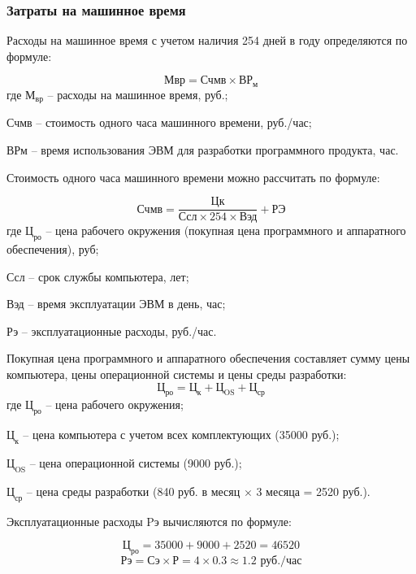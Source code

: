 \documentclass[a4paper]{extarticle}
\begin{document}
\subsubsection{Затраты на машинное время}
Расходы на машинное время с учетом наличия 254 дней в году определяются по формуле:\par
\begin{equation}
\label{form6}
	\text{Мвр}=\text{Счмв}\times \text{ВР}_\text{м}
\end{equation}
где $\text{М}_\text{вр}$ – расходы на машинное время, руб.;\par
Счмв – стоимость одного часа машинного времени, руб./час;\par
ВРм – время использования ЭВМ для разработки программного продукта, час.\par
Стоимость одного часа машинного времени можно рассчитать по формуле:\par
\begin{equation}
\label{form7}
	\text{Счмв}=\frac{\text{Цк}}{\text{Ссл}\times 254\times \text{Вэд}}+\text{РЭ}
\end{equation}
где $\text{Ц}_\text{ро}$ – цена рабочего окружения (покупная цена программного и аппаратного обеспечения), руб;\par
Ссл – срок службы компьютера, лет;\par
Вэд – время эксплуатации ЭВМ в день, час;\par
Рэ – эксплуатационные расходы, руб./час.\par
Покупная цена программного и аппаратного обеспечения составляет сумму цены компьютера, цены операционной системы и цены среды разработки:
\begin{equation}
	\text{Ц}_\text{ро} = \text{Ц}_\text{к}+\text{Ц}_\text{OS}+\text{Ц}_\text{ср}
\end{equation}
где $\text{Ц}_\text{ро}$ – цена рабочего окружения;\par
$\text{Ц}_\text{к}$ – цена компьютера с учетом всех комплектующих (35000 руб.);\par
$\text{Ц}_\text{OS}$ – цена операционной системы (9000 руб.);\par
$\text{Ц}_\text{ср}$ – цена среды разработки (840 руб. в месяц $\times$ 3 месяца = 2520 руб.).\par
Эксплуатационные расходы Pэ вычисляются по формуле:\par
\begin{equation}
	\text{Ц}_\text{ро} = 35000+9000+2520=46520
\end{equation}
\begin{equation}
\label{form8}
	\text{Рэ}=\text{Сэ}\times \text{Р}=4\times 0.3\approx 1.2 \text{ руб./час}
\end{equation}
\end{document}
